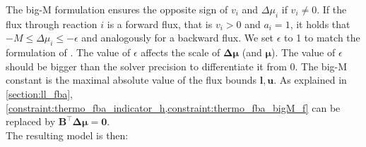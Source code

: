 \vspace*{-\baselineskip}

The big-M formulation ensures the opposite sign of $v_i$ and $\Delta \mu_i$ if $v_i \neq 0$. If the flux through reaction $i$ is a forward flux, that is $v_i > 0$ and $a_i=1$, it holds that $-M \leq \Delta \mu_i \leq -\epsilon$ and analogously for a backward flux. We set $\epsilon$ to 1 to match the formulation of \cite{elimination_infeasible_loops}. The value of $\epsilon$ affects the scale of $\boldsymbol{\Delta \mu}$ (and $\boldsymbol \mu$). The value of $\epsilon$ should be bigger than the solver precision to differentiate it from 0. \newpage The big-M constant is the maximal absolute value of the flux bounds $\mathbf l, \mathbf u$. 
As explained in \cref{section:ll_fba}, \cref{constraint:thermo_fba_indicator_h,constraint:thermo_fba_bigM_f} can be replaced by $\mathbf B^\intercal \boldsymbol{\Delta \mu} = \mathbf 0$.\\
The resulting model is then: 


